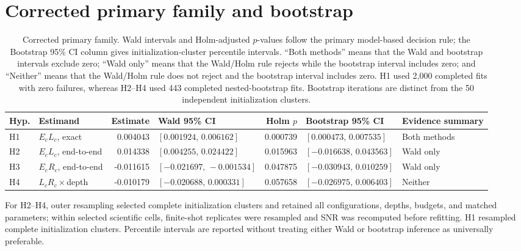 \documentclass[pdflatex,sn-basic,Numbered]{sn-jnl}
\begin{document}
\section{Corrected primary family and bootstrap}

\begin{table}[t]
\centering
\footnotesize
\begin{tabularx}{\textwidth}{@{}l p{} r l r l >{\raggedright\arraybackslash}X@{}}
\toprule
Hyp. & Estimand & Estimate & Wald 95\% CI & Holm $p$ & Bootstrap 95\% CI & Evidence summary \\
\midrule
H1 & $E_cL_c$, exact
   & 0.004043
   & \mbox{$[0.001924,\,0.006162]$}
   & 0.000739
   & \mbox{$[0.000473,\,0.007535]$}
   & Both methods \\
H2 & $E_cL_c$, end-to-end
   & 0.014338
   & \mbox{$[0.004255,\,0.024422]$}
   & 0.015963
   & \mbox{$[-0.016638,\,0.043563]$}
   & Wald only \\
H3 & $E_cR_c$, end-to-end
   & -0.011615
   & \mbox{$[-0.021697,\,-0.001534]$}
   & 0.047875
   & \mbox{$[-0.030943,\,0.010259]$}
   & Wald only \\
H4 & $L_cR_c\times$depth
   & -0.010179
   & \mbox{$[-0.020688,\,0.000331]$}
   & 0.057658
   & \mbox{$[-0.026975,\,0.006403]$}
   & Neither \\
\bottomrule
\end{tabularx}
\caption{Corrected primary family. Wald intervals and Holm-adjusted $p$-values follow the primary model-based decision rule; the Bootstrap 95\% CI column gives initialization-cluster percentile intervals. ``Both methods'' means that the Wald and bootstrap intervals exclude zero; ``Wald only'' means that the Wald/Holm rule rejects while the bootstrap interval includes zero; and ``Neither'' means that the Wald/Holm rule does not reject and the bootstrap interval includes zero. H1 used 2,000 completed fits with zero failures, whereas H2--H4 used 443 completed nested-bootstrap fits. Bootstrap iterations are distinct from the 50 independent initialization clusters.}
\label{supp:tab:primary}
\end{table}

For H2--H4, outer resampling selected complete initialization clusters and retained all configurations, depths, budgets, and matched parameters; within selected scientific cells, finite-shot replicates were resampled and SNR was recomputed before refitting. H1 resampled complete initialization clusters. Percentile intervals are reported without treating either Wald or bootstrap inference as universally preferable.
\end{document}
